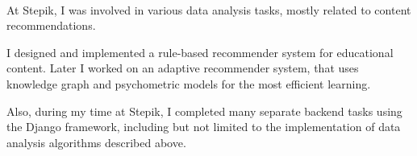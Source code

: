 \documentclass[letterpaper]{deedy-resume} %
\begin{document}
\begin{minipage}[t][0.75\textheight][t]{0.6\textwidth}
\sectionspace %

\\
\sectionspace

\begin{tightitemize}
\item At Stepik, I was involved in various data analysis tasks, mostly related to content recommendations. 
\item I designed and implemented a rule-based recommender system for educational content. Later I worked on an adaptive recommender system, that uses knowledge graph and psychometric models for the most efficient learning. 
\item Also, during my time at Stepik, I completed many separate backend tasks using the Django framework, including but not limited to the implementation of data analysis algorithms described above.
\end{tightitemize}

\sectionspace %










\end{minipage}
\end{document}
